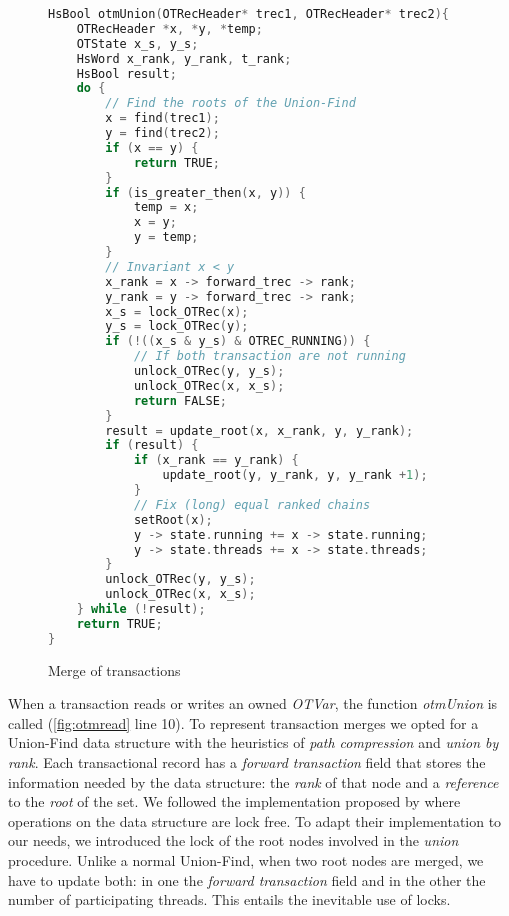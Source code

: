 \begin{figure}
\begin{lstlisting}[language=C]
HsBool otmUnion(OTRecHeader* trec1, OTRecHeader* trec2){
    OTRecHeader *x, *y, *temp;
    OTState x_s, y_s;
    HsWord x_rank, y_rank, t_rank;
    HsBool result;
    do {
        // Find the roots of the Union-Find
        x = find(trec1);
        y = find(trec2);
        if (x == y) {
            return TRUE;
        }
        if (is_greater_then(x, y)) {
            temp = x;
            x = y;
            y = temp;
        }
        // Invariant x < y
        x_rank = x -> forward_trec -> rank;
        y_rank = y -> forward_trec -> rank;
        x_s = lock_OTRec(x);
        y_s = lock_OTRec(y);
        if (!((x_s & y_s) & OTREC_RUNNING)) {
            // If both transaction are not running
            unlock_OTRec(y, y_s);
            unlock_OTRec(x, x_s);
            return FALSE;
        }
        result = update_root(x, x_rank, y, y_rank);
        if (result) {
            if (x_rank == y_rank) {
                update_root(y, y_rank, y, y_rank +1);
            }
            // Fix (long) equal ranked chains
            setRoot(x);
            y -> state.running += x -> state.running;
            y -> state.threads += x -> state.threads;
        }
        unlock_OTRec(y, y_s);
        unlock_OTRec(x, x_s);
    } while (!result);
    return TRUE;
}
\end{lstlisting}
\caption{Merge of transactions}
\label{fig:otmunion}
\end{figure}

When a transaction reads or writes an owned \emph{OTVar}, the function \emph{otmUnion} is called (\cref{fig:otmread} line 10).
To represent transaction merges we opted for a Union-Find data structure with the heuristics of \emph{path compression} and \emph{union by rank}.
Each transactional record has a \emph{forward transaction} field that stores the information needed by the data structure: the \emph{rank} of that node and a \emph{reference} to the \emph{root} of the set.
We followed the implementation proposed by \citet{Anderson94wait-freeparallel} where operations on the data structure are lock free.
To adapt their implementation to our needs, we introduced the lock of the root nodes involved in the \emph{union} procedure. Unlike a normal Union-Find, when two root nodes are merged, we have to update both: in one the \emph{forward transaction} field and in the other the number of participating threads. This entails the inevitable use of locks.

